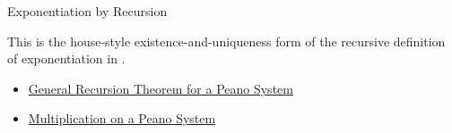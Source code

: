 \begin{topicbox}{Exponentiation by Recursion}
\begin{remark*}
This is the house-style existence-and-uniqueness form of the recursive
definition of exponentiation in \citep{FefermanNumberSystems1964}.
\end{remark*}

\begin{dependencies}
\begin{itemize}
  \item \hyperref[thm:general-recursion-theorem-for-peano-system]{General Recursion Theorem for a Peano System}
  \item \hyperref[def:multiplication-on-peano-system]{Multiplication on a Peano System}
\end{itemize}
\end{dependencies}
\end{topicbox}

